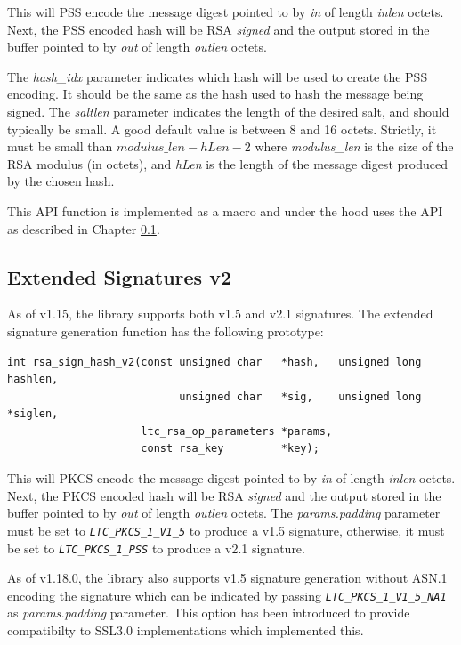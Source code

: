 \documentclass[synpaper]{book}
\newcommand{\code}[1]{\texttt{\textit{#1}}}
\begin{document}
This will PSS encode the message digest pointed to by \textit{in} of length \textit{inlen} octets.  Next, the PSS encoded hash will be RSA
\textit{signed} and the output stored in the buffer pointed to by \textit{out} of length \textit{outlen} octets.

The \textit{hash\_idx} parameter indicates which hash will be used to create the PSS encoding.  It should be the same as the hash used to
hash the message being signed.  The \textit{saltlen} parameter indicates the length of the desired salt, and should typically be small.  A good
default value is between 8 and 16 octets.  Strictly, it must be small than $modulus\_len - hLen - 2$ where \textit{modulus\_len} is the size of
the RSA modulus (in octets), and \textit{hLen} is the length of the message digest produced by the chosen hash.

This API function is implemented as a macro and under the hood uses the API as described in Chapter \ref{rsa-sign-v2}.

\subsection{Extended Signatures v2}
\label{rsa-sign-v2}

As of v1.15, the library supports both v1.5 and v2.1 signatures.  The extended signature generation function has the following prototype:

\begin{verbatim}
int rsa_sign_hash_v2(const unsigned char   *hash,   unsigned long  hashlen,
                           unsigned char   *sig,    unsigned long *siglen,
                     ltc_rsa_op_parameters *params,
                     const rsa_key         *key);
\end{verbatim}

This will PKCS encode the message digest pointed to by \textit{in} of length \textit{inlen} octets.  Next, the PKCS encoded hash will be RSA
\textit{signed} and the output stored in the buffer pointed to by \textit{out} of length \textit{outlen} octets.  The \textit{params.padding} parameter
must be set to \code{LTC\_PKCS\_1\_V1\_5} to produce a v1.5 signature, otherwise, it must be set to \code{LTC\_PKCS\_1\_PSS} to produce a
v2.1 signature.

As of v1.18.0, the library also supports v1.5 signature generation without ASN.1 encoding the signature which can be indicated by passing
\code{LTC\_PKCS\_1\_V1\_5\_NA1} as \textit{params.padding} parameter. This option has been introduced to provide compatibilty to SSL3.0 implementations
which implemented this.
\end{document}
